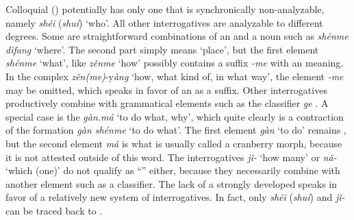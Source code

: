 Colloquial \textbf{ } () potentially has only one  that is synchronically non-analyzable, namely \textit{shéi} (\textit{shuí}) ‘who’. All other interrogatives are analyzable to different degrees. Some are straightforward combinations of an  and a noun such as \textit{shénme dìfang} ‘where’. The second part simply means ‘place’, but the first element \textit{shénme} ‘what’, like \textit{zěnme} ‘how’ possibly contains a suffix \textit{-me} with an  meaning. In the complex  \textit{zěn(}\textit{me)}-y\textit{àng} ‘how, what kind of, in what way’, the element \textit{-me} may be omitted, which speaks in favor of an  as a suffix. Other interrogatives productively combine with grammatical elements such as the classifier \textit{ge} . A special case is the  \textit{gàn.}\textit{má} ‘to do what, why’, which quite clearly is a contraction of the  formation \textit{gàn shénme} ‘to do what’. The first element \textit{gàn} ‘to do’ remains , but the second element \textit{má} is what is usually called a cranberry morph, because it is not attested outside of this word. The interrogatives \textit{jǐ-} ‘how many’ or \textit{nǎ-} ‘which (one)’ do not qualify as “” either, because they necessarily combine with another element such as a classifier. The lack of a strongly developed  speaks in favor of a relatively new system of interrogatives. In fact, only \textit{shéi} (\textit{shuí})  and \textit{jǐ}\textit{-}  can be traced back to .


